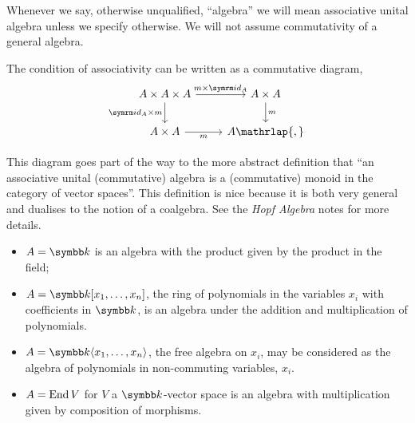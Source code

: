 Whenever we say, otherwise unqualified, \enquote{algebra} we will mean associative unital algebra unless we specify otherwise.
We will not assume commutativity of a general algebra.

The condition of associativity can be written as a commutative diagram,
\begin{equation}
    \begin{tikzcd}
        A \times A \times A \arrow[r, "m \times \id_A"] \arrow[d, "\id_A \times m"'] & A \times A \arrow[d, "m"]\\
        A \times A \arrow[r, "m"'] & A\mathrlap{,}
    \end{tikzcd}
\end{equation}

\begin{remark}{}{}
    This diagram goes part of the way to the more abstract definition that \enquote{an associative unital (commutative) algebra is a (commutative) monoid in the category of vector spaces}.
    This definition is nice because it is both very general and dualises to the notion of a coalgebra.
    See the \textit{Hopf Algebra} notes for more details.
\end{remark}

\begin{exm}{}{}
    \begin{itemize}
        \item \(A = \field\) is an algebra with the product given by the product in the field;
        \item \(A = \field[x_1, \dotsc, x_n]\), the ring of polynomials in the variables \(x_i\) with coefficients in \(\field\), is an algebra under the addition and multiplication of polynomials.
        \item \(A = \field \langle x_1, \dotsc, x_n \rangle\), the free algebra on \(x_i\), may be considered as the algebra of polynomials in non-commuting variables, \(x_i\).
        \item \(A = \operatorname{End} V\) for \(V\) a \(\field\)-vector space is an algebra with multiplication given by composition of morphisms.
    \end{itemize}
\end{exm}

